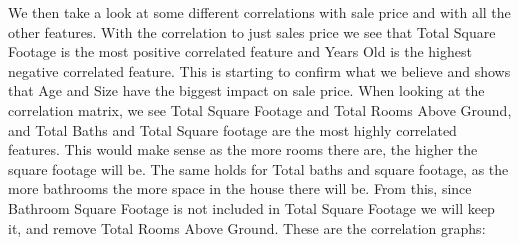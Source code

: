 \documentclass{article}
\begin{document}
	We then take a look at some different correlations with sale price and with all the other features. With the correlation to just sales price we see that Total Square Footage is the most positive correlated feature and Years Old is the highest negative correlated feature. This is starting to confirm what we believe and shows that Age and Size have the biggest impact on sale price. When looking at the correlation matrix, we see Total Square Footage and Total Rooms Above Ground, and Total Baths and Total Square footage are the most highly correlated features. This would make sense as the more rooms there are, the higher the square footage will be. The same holds for Total baths and square footage, as the more bathrooms the more space in the house there will be. From this, since Bathroom Square Footage is not included in Total Square Footage we will keep it, and remove Total Rooms Above Ground. These are the correlation graphs:
	
\end{document}
